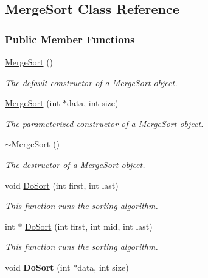 \hypertarget{class_merge_sort}{}\subsection{Merge\+Sort Class Reference}
\label{class_merge_sort}
\subsubsection*{Public Member Functions}
\begin{DoxyCompactItemize}
\item 
\hyperlink{class_merge_sort_a55ae6cf0736f402fc4f0db2d9326a641}{Merge\+Sort} ()
\begin{DoxyCompactList}\small\item\em The default constructor of a \hyperlink{class_merge_sort}{Merge\+Sort} object. \end{DoxyCompactList}\item 
\hyperlink{class_merge_sort_abc29044c4779dac7ae35b476e3bff294}{Merge\+Sort} (int $\ast$data, int size)
\begin{DoxyCompactList}\small\item\em The parameterized constructor of a \hyperlink{class_merge_sort}{Merge\+Sort} object. \end{DoxyCompactList}\item 
\hyperlink{class_merge_sort_a7140fd17b17558d9810c8e791c353909}{$\sim$\+Merge\+Sort} ()
\begin{DoxyCompactList}\small\item\em The destructor of a \hyperlink{class_merge_sort}{Merge\+Sort} object. \end{DoxyCompactList}\item 
void \hyperlink{class_merge_sort_a51d177b7a69bec202ebc6f6bf5b55adc}{Do\+Sort} (int first, int last)
\begin{DoxyCompactList}\small\item\em This function runs the sorting algorithm. \end{DoxyCompactList}\item 
int $\ast$ \hyperlink{class_merge_sort_a3d6520e0f0d28d99f68ad60766bb5a95}{Do\+Sort} (int first, int mid, int last)
\begin{DoxyCompactList}\small\item\em This function runs the sorting algorithm. \end{DoxyCompactList}\item 
void {\bfseries Do\+Sort} (int $\ast$data, int size)\hypertarget{class_merge_sort_a534de28f6f40cf1a71c8305b4312407b}{}\label{class_merge_sort_a534de28f6f40cf1a71c8305b4312407b}


\end{DoxyCompactItemize}
